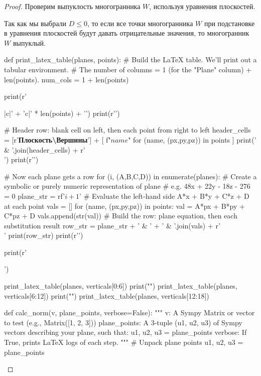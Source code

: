 \begin{proof}
    Проверим выпуклость многогранника $W$, используя уравнения плоскостей.

    Так как мы выбрали $D \leq 0$, то если все точки многогранника $W$ при подстановке в уравнения плоскостей будут давать отрицательные значения, то многогранник $W$ выпуклый.

    \begin{sympycode}
def print_latex_table(planes, points):
    # Build the LaTeX table. We'll print out a tabular environment.
    # The number of columns = 1 (for the "Plane" column) + len(points).
    num_cols = 1 + len(points)

    print(r'\begin{tabular}{|c|' + 'c|' * len(points) + '}')
    print(r'\hline')

    # Header row: blank cell on left, then each point from right to left
    header_cells = [r'\textbf{Плоскость\textbackslash Вершины}'] + [
        f"${name}$" for (name, (px,py,pz)) in points
    ]
    print(' & '.join(header_cells) + r'\\')
    print(r'\hline')

    # Now each plane gets a row
    for (i, (A,B,C,D)) in enumerate(planes):
        # Create a symbolic or purely numeric representation of plane
        # e.g. 48x + 22y - 18z - 276 = 0
        plane_str = rf'${i + 1}$'
        # Evaluate the left-hand side A*x + B*y + C*z + D at each point
        vals = []
        for (name, (px,py,pz)) in points:
            val = A*px + B*py + C*pz + D
            vals.append(str(val))
        # Build the row: plane equation, then each substitution result
        row_str = plane_str + ' & ' + ' & '.join(vals) + r'\\'
        print(row_str)
        print(r'\hline')

    print(r'\end{tabular}')    
\end{sympycode}
    {\tiny
    \begin{sympycode}
print_latex_table(planes, verticals[0:6])
print("\n")
print_latex_table(planes, verticals[6:12])
print("\n")
print_latex_table(planes, verticals[12:18])
    \end{sympycode}
    }
    \normalsize

    \begin{sympycode}
def calc_norm(v, plane_points, verbose=False):
    """
    v: A Sympy Matrix or vector to test (e.g., Matrix([1, 2, 3])) 
    plane_points: A 3-tuple (u1, u2, u3) of Sympy vectors 
                 describing your plane, such that:
                    u1, u2, u3 = plane_points
    verbose: If True, prints LaTeX logs of each step.
    """
    # Unpack plane points
    u1, u2, u3 = plane_points


\end{sympycode}
\end{proof}
